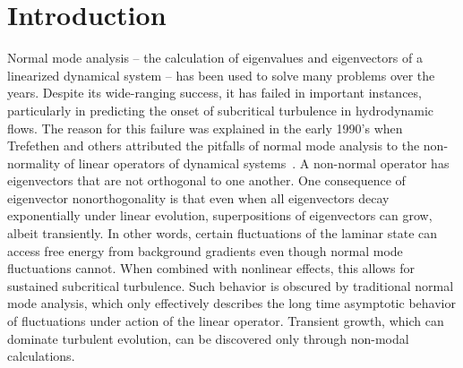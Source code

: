 \documentclass[letter,scriptaddress,twocolumn, prl,showkeys]{revtex4}
\begin{document}
\title{}

\author{B. Friedman}

\author{T.A. Carter}




\begin{abstract}

\end{abstract}

\maketitle

\section{Introduction}

Normal mode analysis -- the calculation of eigenvalues and eigenvectors of a linearized dynamical system -- has been used to solve many problems over the years.
Despite its wide-ranging success, it has failed in important instances, particularly in predicting the onset of subcritical turbulence in hydrodynamic flows. 
The reason for this failure was explained in the early 1990's when Trefethen and others attributed the pitfalls of normal mode analysis to the non-normality of linear operators of
dynamical systems~\cite{trefethen1993,schmid2007}. A non-normal operator has 
eigenvectors that are not orthogonal to one another. One consequence of eigenvector nonorthogonality is that even when all eigenvectors decay exponentially under linear evolution, 
superpositions of eigenvectors can grow, albeit transiently.
In other words, certain fluctuations of the laminar state can access free energy from background gradients even though normal mode fluctuations cannot.
When combined with nonlinear effects, this allows for sustained subcritical turbulence.
Such behavior is obscured by traditional normal mode analysis, which only effectively describes the long time asymptotic behavior of fluctuations under  
action of the linear operator. Transient growth, which can dominate turbulent evolution, can be discovered only through non-modal calculations.
\end{document}
